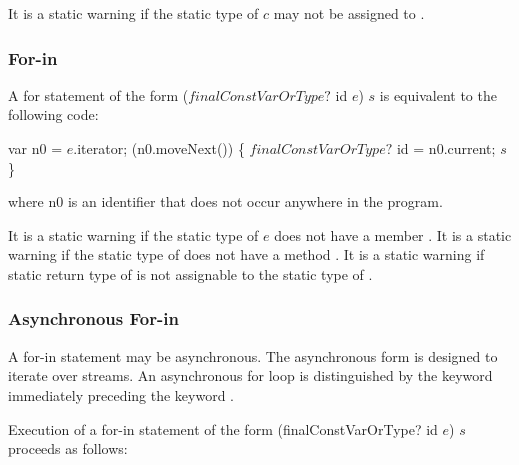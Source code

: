 \documentclass{article}
\newcommand{\code}[1]{{\sf #1}}
\begin{document}
\LMHash{}
It is a static warning if the static type of $c$ may not be assigned to .




\subsubsection{For-in}

\LMHash{}
A for statement of the form \code{ \FOR{} ($finalConstVarOrType?$ id \IN{} $e$) $s$} is equivalent to the following code: 

\begin{dartCode}
var n0 = $e$.iterator;
\WHILE{} (n0.moveNext()) \{
   $finalConstVarOrType?$ id = n0.current;
   $s$ 
\}
\end{dartCode}
where \code{n0} is an identifier that does not occur anywhere in the program.


It is a static warning if the static type of $e$ does not have a member . It is a static warning if the static type of  does not have a method . It is a static warning if static return type of   is not assignable to the static type of .


 
 
\subsubsection{Asynchronous For-in}

\LMHash{}
A for-in statement may be asynchronous. The asynchronous form is designed to iterate over streams. An asynchronous for loop is distinguished by the keyword \AWAIT{} immediately preceding the keyword \FOR.

\LMHash{}
Execution of a for-in statement of the form  \code{\AWAIT{} \FOR{} (finalConstVarOrType? id \IN{} $e$) $s$} proceeds as follows:
\end{document}
